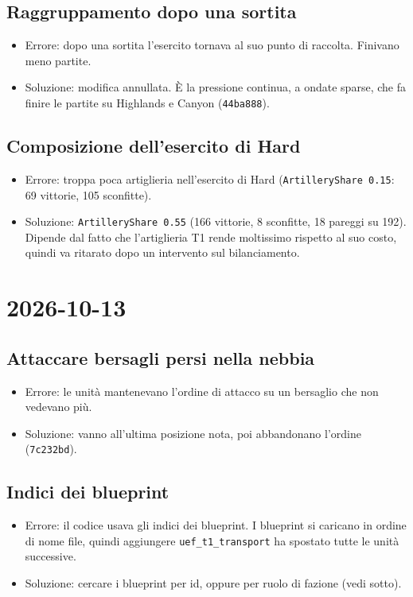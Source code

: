 \documentclass[11pt]{article}
\begin{document}
\subsection{Raggruppamento dopo una sortita}
\label{sec:orgd40860e}
\begin{itemize}
\item Errore: dopo una sortita l'esercito tornava al suo punto di raccolta. Finivano meno partite.
\item Soluzione: modifica annullata. È la pressione continua, a ondate sparse, che fa finire le partite su Highlands e
Canyon (\texttt{44ba888}).
\end{itemize}
\subsection{Composizione dell'esercito di Hard}
\label{sec:orgbbb9024}
\begin{itemize}
\item Errore: troppa poca artiglieria nell'esercito di Hard (\texttt{ArtilleryShare 0.15}: 69 vittorie, 105 sconfitte).
\item Soluzione: \texttt{ArtilleryShare 0.55} (166 vittorie, 8 sconfitte, 18 pareggi su 192). Dipende dal fatto che
l'artiglieria T1 rende moltissimo rispetto al suo costo, quindi va ritarato dopo un intervento sul bilanciamento.
\end{itemize}
\section{2026-10-13}
\label{sec:orgaa2a005}

\subsection{Attaccare bersagli persi nella nebbia}
\label{sec:orgc09c19b}
\begin{itemize}
\item Errore: le unità mantenevano l'ordine di attacco su un bersaglio che non vedevano più.
\item Soluzione: vanno all'ultima posizione nota, poi abbandonano l'ordine (\texttt{7c232bd}).
\end{itemize}
\subsection{Indici dei blueprint}
\label{sec:orgdcd6558}
\begin{itemize}
\item Errore: il codice usava gli indici dei blueprint. I blueprint si caricano in ordine di nome file, quindi aggiungere
\texttt{uef\_t1\_transport} ha spostato tutte le unità successive.
\item Soluzione: cercare i blueprint per id, oppure per ruolo di fazione (vedi sotto).
\end{itemize}
\end{document}
